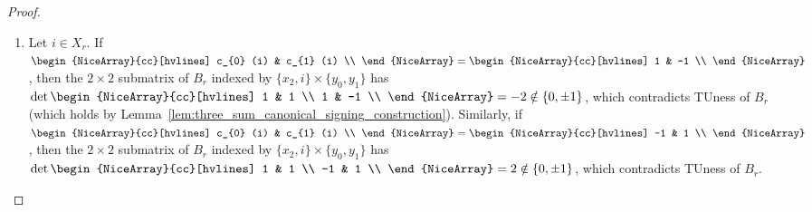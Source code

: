 \documentclass{article}
\theoremstyle{definition}
\begin{document}
\begin{proof}
    \begin{enumerate}
        \item Let $i \in X_{r}$. If $\begin{NiceArray}{cc}[hvlines] c_{0} (i) & c_{1} (i) \\ \end{NiceArray} = \begin{NiceArray}{cc}[hvlines] 1 & -1 \\ \end{NiceArray}$, then the $2 \times 2$ submatrix of $B_{r}$ indexed by $\{x_{2}, i\} \times \{y_{0}, y_{1}\}$ has $\det \begin{NiceArray}{cc}[hvlines] 1 & 1 \\ 1 & -1 \\ \end{NiceArray} = -2 \notin \{0, \pm 1\}$, which contradicts TUness of $B_{r}$ (which holds by Lemma~\ref{lem:three_sum_canonical_signing_construction}). Similarly, if $\begin{NiceArray}{cc}[hvlines] c_{0} (i) & c_{1} (i) \\ \end{NiceArray} = \begin{NiceArray}{cc}[hvlines] -1 & 1 \\ \end{NiceArray} $, then the $2 \times 2$ submatrix of $B_{r}$ indexed by $\{x_{2}, i\} \times \{y_{0}, y_{1}\}$ has $\det \begin{NiceArray}{cc}[hvlines] 1 & 1 \\ -1 & 1 \\ \end{NiceArray} = 2 \notin \{0, \pm 1\}$, which contradicts TUness of $B_{r}$.



\end{enumerate}
\end{proof}
\end{document}
